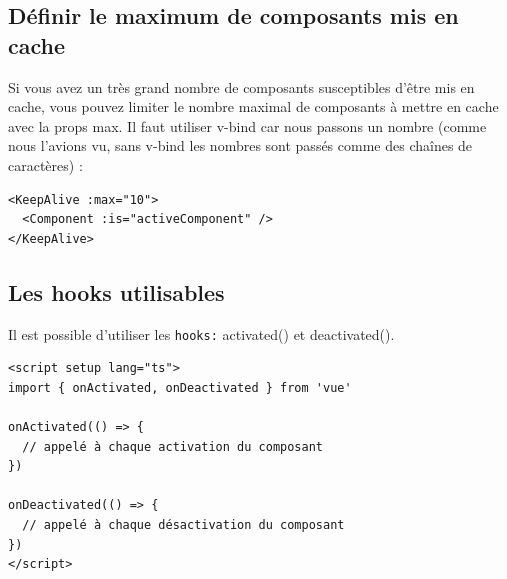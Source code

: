 \subsection{Définir le maximum de composants mis en cache}
Si vous avez un très grand nombre de composants susceptibles d'être mis en cache, vous pouvez limiter le nombre maximal de composants à mettre en cache avec la {\color{monOrange}props max}. Il faut utiliser {\color{monOrange}v-bind} car nous passons un nombre (comme nous l'avions vu, sans {\color{monOrange}v-bind} les nombres sont passés comme des chaînes de caractères) :
\begin{verbatim}
<KeepAlive :max="10">
  <Component :is="activeComponent" />
</KeepAlive>
\end{verbatim}
\subsection{Les {\color{monOrange}hooks} utilisables}
Il est possible d'utiliser les {\tt hooks:} {\color{monOrange}activated()} et {\color{monOrange}deactivated()}.
\begin{verbatim}
<script setup lang="ts">
import { onActivated, onDeactivated } from 'vue'

onActivated(() => {
  // appelé à chaque activation du composant
})

onDeactivated(() => {
  // appelé à chaque désactivation du composant
})
</script>
\end{verbatim}

